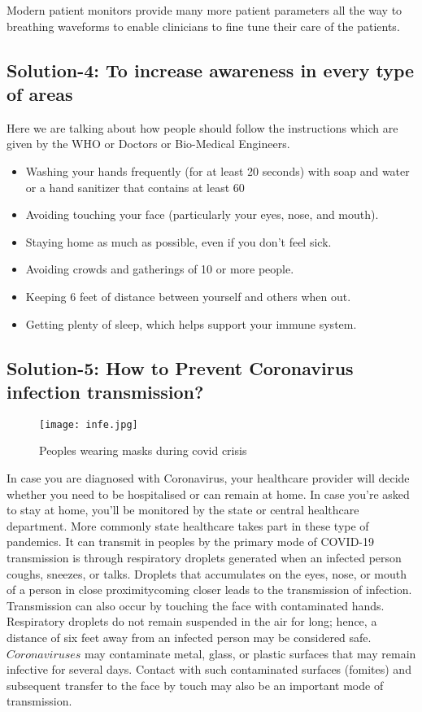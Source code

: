 \documentclass[12pts]{article}
\begin{document}
Modern patient monitors provide many more patient parameters all the way to breathing waveforms to enable clinicians to fine tune their care of the patients.

\subsection*{Solution-4: To increase awareness in every type of areas }

Here we are talking about how people should follow the instructions which are given by the WHO or Doctors or Bio-Medical Engineers.
\begin{itemize}
\item Washing your hands frequently (for at least 20 seconds) with soap and water or a hand
sanitizer that contains at least 60%

\item  Avoiding touching your face (particularly your eyes, nose, and mouth).
\item Staying home as much as possible, even if you don’t feel sick.
\item Avoiding crowds and gatherings of 10 or more people.
\item Keeping 6 feet of distance between yourself and others when out.
\item Getting plenty of sleep, which helps support your immune system.
\end{itemize}


\subsection*{Solution-5: How to Prevent Coronavirus infection transmission?}

\begin{figure}[h]
\centering
\texttt{[image: infe.jpg]}
\caption{Peoples wearing masks during covid crisis}
\end{figure}

In case you are diagnosed with Coronavirus, your healthcare provider will decide whether you need to be hospitalised or can remain at home. In case you’re asked to stay at home, you’ll be monitored by the state or central healthcare department. More commonly state healthcare takes part in these type of pandemics.
It can transmit in peoples by the primary mode of COVID-19 transmission is through respiratory droplets generated when an infected person coughs, sneezes, or talks. Droplets that accumulates on the eyes, nose, or mouth of a person in close proximity{coming closer} leads to the transmission of infection. Transmission can also occur by touching the face with contaminated hands. Respiratory droplets do not remain suspended in the air for long; hence, a distance of six feet away from an infected person may be considered safe.\\
$Coronaviruses$ may contaminate metal, glass, or plastic surfaces that may remain infective for several days. Contact with such contaminated surfaces (fomites) and subsequent transfer to the face by touch may also be an important mode of transmission.
\end{document}
